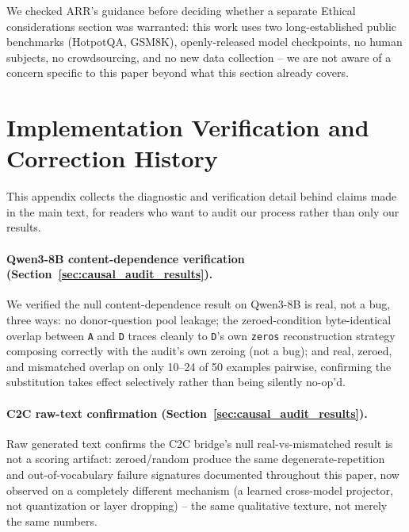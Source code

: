 \documentclass[11pt]{article}
\begin{document}
We checked ARR's guidance before deciding whether a separate Ethical
considerations section was warranted: this work uses two long-established
public benchmarks (HotpotQA, GSM8K), openly-released model checkpoints,
no human subjects, no crowdsourcing, and no new data collection -- we are
not aware of a concern specific to this paper beyond what this section
already covers.




\appendix
\section{Implementation Verification and Correction History}
\label{sec:appendix_verification}

This appendix collects the diagnostic and verification detail behind
claims made in the main text, for readers who want to audit our process
rather than only our results.

\paragraph{Qwen3-8B content-dependence verification (Section~\ref{sec:causal_audit_results}).}
We verified the null content-dependence result on Qwen3-8B is real, not a
bug, three ways: no donor-question pool leakage; the zeroed-condition
byte-identical overlap between \texttt{A} and \texttt{D} traces cleanly
to \texttt{D}'s own \texttt{zeros} reconstruction strategy composing
correctly with the audit's own zeroing (not a bug); and real, zeroed, and
mismatched overlap on only 10--24 of 50 examples pairwise, confirming the
substitution takes effect selectively rather than being silently
no-op'd.

\paragraph{C2C raw-text confirmation (Section~\ref{sec:causal_audit_results}).}
Raw generated text confirms the C2C bridge's null real-vs-mismatched
result is not a scoring artifact: zeroed/random produce the same
degenerate-repetition and out-of-vocabulary failure signatures documented
throughout this paper, now observed on a completely different mechanism
(a learned cross-model projector, not quantization or layer dropping) --
the same qualitative texture, not merely the same numbers.
\end{document}
